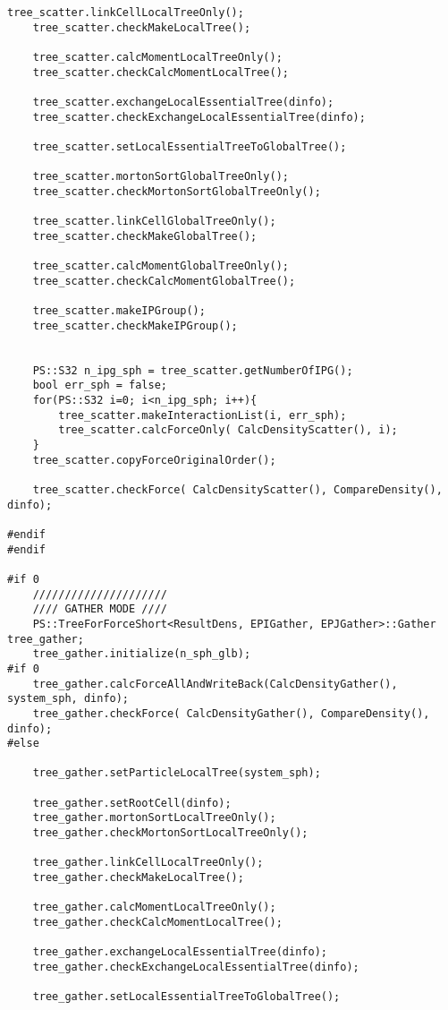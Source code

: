 \begin{lstlisting}[caption=開放境界、モートンソート、ローカルツリー構築、モーメント計算、LET交換、グローバルツリー構築、相互作用計算のテスト]
    tree_scatter.linkCellLocalTreeOnly();
    tree_scatter.checkMakeLocalTree();

    tree_scatter.calcMomentLocalTreeOnly();
    tree_scatter.checkCalcMomentLocalTree();

    tree_scatter.exchangeLocalEssentialTree(dinfo);
    tree_scatter.checkExchangeLocalEssentialTree(dinfo);

    tree_scatter.setLocalEssentialTreeToGlobalTree();

    tree_scatter.mortonSortGlobalTreeOnly();
    tree_scatter.checkMortonSortGlobalTreeOnly();

    tree_scatter.linkCellGlobalTreeOnly();
    tree_scatter.checkMakeGlobalTree();

    tree_scatter.calcMomentGlobalTreeOnly();
    tree_scatter.checkCalcMomentGlobalTree();

    tree_scatter.makeIPGroup();
    tree_scatter.checkMakeIPGroup();
    

    PS::S32 n_ipg_sph = tree_scatter.getNumberOfIPG();
    bool err_sph = false;
    for(PS::S32 i=0; i<n_ipg_sph; i++){
        tree_scatter.makeInteractionList(i, err_sph);
        tree_scatter.calcForceOnly( CalcDensityScatter(), i);
    }
    tree_scatter.copyForceOriginalOrder();

    tree_scatter.checkForce( CalcDensityScatter(), CompareDensity(), dinfo);

#endif
#endif

#if 0
    /////////////////////
    //// GATHER MODE ////
    PS::TreeForForceShort<ResultDens, EPIGather, EPJGather>::Gather tree_gather; 
    tree_gather.initialize(n_sph_glb);
#if 0
    tree_gather.calcForceAllAndWriteBack(CalcDensityGather(), system_sph, dinfo);
    tree_gather.checkForce( CalcDensityGather(), CompareDensity(), dinfo);
#else

    tree_gather.setParticleLocalTree(system_sph);

    tree_gather.setRootCell(dinfo);
    tree_gather.mortonSortLocalTreeOnly();
    tree_gather.checkMortonSortLocalTreeOnly();

    tree_gather.linkCellLocalTreeOnly();
    tree_gather.checkMakeLocalTree();

    tree_gather.calcMomentLocalTreeOnly();
    tree_gather.checkCalcMomentLocalTree();

    tree_gather.exchangeLocalEssentialTree(dinfo);
    tree_gather.checkExchangeLocalEssentialTree(dinfo);

    tree_gather.setLocalEssentialTreeToGlobalTree();


\end{lstlisting}
